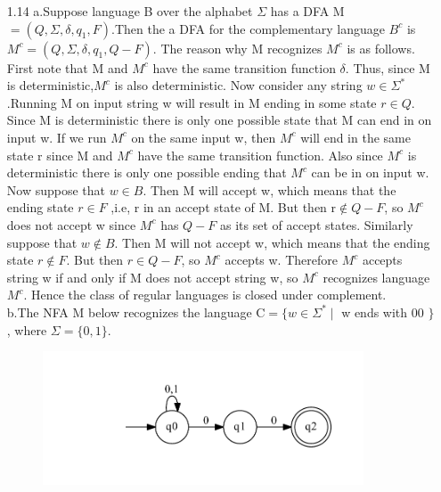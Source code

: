 \documentclass[10pt] {article}
\begin{document}
\begin{enumerate}
\begin{proof}
\[
  \delta^{'}=\begin{cases}
               \delta(q,a)if a \neq \varepsilon or q \not \in F \\\
               \delta(q,a)\cup\{q_{accept}if a = \varepsilon and q \in F \}\\
            \end{cases}
\]
and $\delta^{'}(q_{accept},a)= \emptyset$ for each $a \in \Sigma$
\end{proof}
\item[1.14]
a.Suppose language B  over the alphabet $\Sigma$ has a DFA M$=(Q,\Sigma,\delta,q_1,F)$.Then the a DFA for the complementary language $B^c$ is $M^c=(Q,\Sigma,\delta,q_1,Q-F)$. The reason why M recognizes $M^c$ is as follows. First note that M and $M^c$ have the same transition function $\delta$. Thus, since M is deterministic,$M^c$ is also deterministic. Now consider any string $w \in \Sigma^{*}$.Running M on input string w will result in M ending in some state $r \in Q$. Since M is deterministic there is only one possible state that M can end in on input w. If we run $M^c$ on the same input w, then $M^c$ will end in the same state r since M and $M^c$ have the same transition function. Also since $M^c$ is deterministic there is only one possible ending that $M^c$ can be in on input w.\\
Now suppose that $w \in B$. Then M will accept w, which means that the ending state $r \in F$ ,i.e, r in an accept state of M. But then r$\not \in Q-F$, so $M^{c}$ does not accept w since $M^{c}$ has $Q-F$ as its set of accept states. Similarly suppose that $w \not \in B$. Then M will not accept w, which means that the ending state $r \not \in F$. But then $r \in Q-F$, so $M^{c}$ accepts w. Therefore $M^{c}$ accepts string w if and only if M does not accept string w, so $M^{c}$ recognizes language $M^{c}$. Hence the class of regular languages is closed under complement.\\
b.The NFA M below recognizes the language C$=\{ w \in \Sigma^{*} \mid$ w ends with 00 $\}$, where $\Sigma=\{0,1 \}$. 
\begin{figure}[H]
\includegraphics[width=0.9\textwidth]{a114.pdf}

\end{figure}
\end{enumerate}
\end{document}
